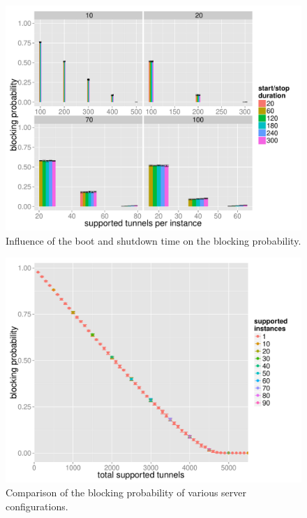 \begin{figure}[htbp]
  \centering
  \includegraphics[width=1.0\textwidth]{images/startstopduration-blockingprobability-barchart.pdf}
  \caption{Influence of the boot and shutdown time on the blocking probability.}
 \label{c4:fig:blockprob-startstop-barchart}
\end{figure}

\begin{figure}[htbp]
  \centering
  \includegraphics[width=1.0\textwidth]{images/feasiblemultiserver-blockprob.pdf}
  \caption{Comparison of the blocking probability of various server configurations.}
 \label{c4:fig:blockprob-multiserver}
\end{figure}

